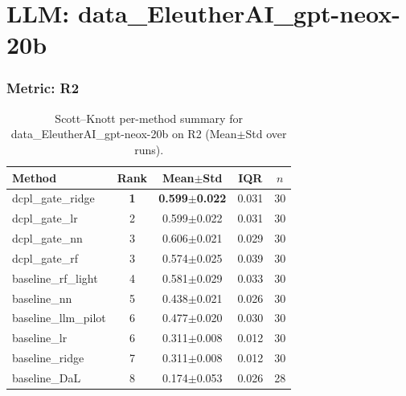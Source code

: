 \section*{LLM: data\_EleutherAI\_gpt-neox-20b}

\subsubsection*{Metric: R2}
\begin{table}[H]
\centering
\scriptsize
\setlength{\tabcolsep}{4pt}
\renewcommand{\arraystretch}{1.1}
\caption{Scott--Knott per-method summary for data\_EleutherAI\_gpt-neox-20b on R2 (Mean$\pm$Std over runs).}
\label{tab:sk_data_EleutherAI_gpt-neox-20b_R2}
\begin{tabular}{l|c|c|c|c}
\hline
\textbf{Method} & \textbf{Rank} & \textbf{Mean$\pm$Std} & \textbf{IQR} & \textbf{$n$} \\
\hline
\rowcolor{red!15} dcpl\_gate\_ridge & \textbf{1} & \textbf{0.599$\pm$0.022} & 0.031 & 30 \\
dcpl\_gate\_lr & 2 & 0.599$\pm$0.022 & 0.031 & 30 \\
dcpl\_gate\_nn & 3 & 0.606$\pm$0.021 & 0.029 & 30 \\
dcpl\_gate\_rf & 3 & 0.574$\pm$0.025 & 0.039 & 30 \\
baseline\_rf\_light & 4 & 0.581$\pm$0.029 & 0.033 & 30 \\
baseline\_nn & 5 & 0.438$\pm$0.021 & 0.026 & 30 \\
baseline\_llm\_pilot & 6 & 0.477$\pm$0.020 & 0.030 & 30 \\
baseline\_lr & 6 & 0.311$\pm$0.008 & 0.012 & 30 \\
baseline\_ridge & 7 & 0.311$\pm$0.008 & 0.012 & 30 \\
baseline\_DaL & 8 & 0.174$\pm$0.053 & 0.026 & 28 \\
\hline
\end{tabular}
\end{table}

